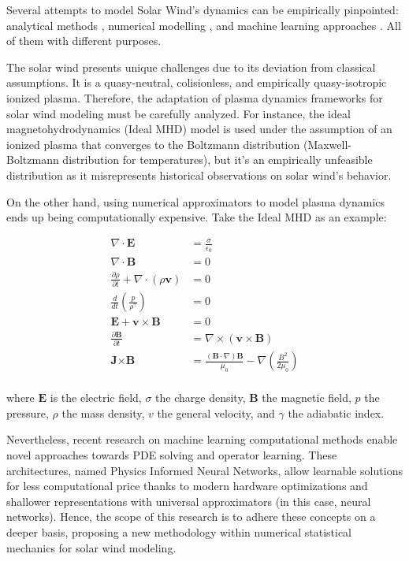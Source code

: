 \documentclass[12pt]{article}
\begin{document}
Several attempts to model Solar Wind's dynamics can be empirically pinpointed: analytical methods \cite{BLUME202396}, numerical modelling \cite{10.3389/fspas.2023.1105797, windmodelling1, Gombosi_2018}, and machine learning approaches \cite{comp_2, comp_3, guastavino2024forecastinggeoffectiveeventssolar, sabbatini2023solarwindspeedestimate, https://doi.org/10.1029/2023SW003561}. All of them with different purposes.

The solar wind presents unique challenges due to its deviation from classical assumptions. It is a quasy-neutral, colisionless, and empirically quasy-isotropic ionized plasma. \cite{Verscharen2022} Therefore, the adaptation of plasma dynamics frameworks for solar wind modeling must be carefully analyzed. For instance, the ideal magnetohydrodynamics (Ideal MHD) model is used under the assumption of an ionized plasma that converges to the Boltzmann distribution (Maxwell-Boltzmann distribution for temperatures), but it's an empirically unfeasible distribution as it misrepresents historical observations on solar wind's behavior.

On the other hand, using numerical approximators to model plasma dynamics ends up being computationally expensive. Take the Ideal MHD as an example:

\begin{align*}
    \nabla \cdot \textbf{E} &= \frac{\sigma}{\epsilon_0} \\
    \nabla \cdot \textbf{B} &= 0 \\
    \frac{\partial \rho}{\partial t} + \nabla \cdot (\rho \textbf{v}) &= 0 \\
    \frac{d}{dt} \left( \frac{p}{\rho^\gamma} \right) &= 0 \\
    \textbf{E} + \textbf{v} \times \textbf{B} &= 0 \\
    \frac{\partial \textbf{B}}{\partial t} &= \nabla \times (\textbf{v} \times \textbf{B}) \\
    \textbf{J} \times \textbf{B} &= \frac{(\textbf{B}\cdot \nabla) \textbf{B}}{\mu_0} - \nabla \left(\frac{B^2}{2\mu_0}\right) \\
\end{align*}

where $\mathbf{E}$ is the electric field, $\sigma$ the charge density, $\mathbf{B}$ the magnetic field, $p$ the pressure, $\rho$ the mass density, $v$ the general velocity, and $\gamma $ the adiabatic index.

Nevertheless, recent research on machine learning computational methods enable novel approaches towards PDE solving and operator learning. These architectures, named Physics Informed Neural Networks, allow learnable solutions for less computational price thanks to modern hardware optimizations and shallower representations with universal approximators (in this case, neural networks). Hence, the scope of this research is to adhere these concepts on a deeper basis, proposing a new methodology within numerical statistical mechanics for solar wind modeling.
\end{document}
